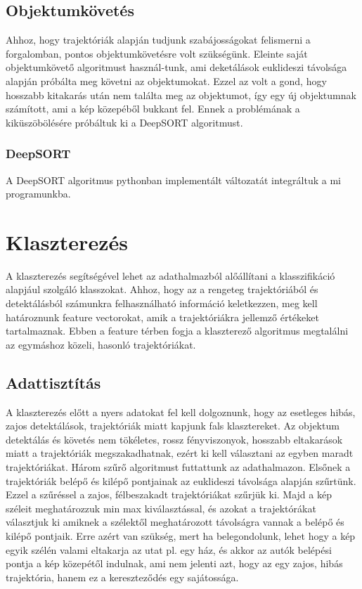 \documentclass[acmtog, authorversion]{acmart}
\begin{document}
\subsection{Objektumkövetés}
Ahhoz, hogy trajektóriák alapján tudjunk szabájosságokat felismerni a forgalomban, pontos objektumkövetésre volt szükségünk. Eleinte
saját objektumkövető algoritmust használ-tunk, ami deketálások euklideszi távolsága alapján próbálta meg követni az objektumokat.
Ezzel az volt a gond, hogy hosszabb kitakarás után nem találta meg az objektumot, így egy új objektumnak számított, ami a kép
közepéből bukkant fel. Ennek a problémának a kiküszöbölésére próbáltuk ki a DeepSORT algoritmust.
\subsubsection{DeepSORT}
A DeepSORT algoritmus pythonban implementált változatát integráltuk a mi programunkba.

\section{Klaszterezés}
A klaszterezés segítségével lehet az adathalmazból alőállítani a klasszifikáció alapjául szolgáló klasszokat. Ahhoz, hogy az
a rengeteg trajektóriából és detektálásból számunkra felhasználható információ keletkezzen, meg kell határoznunk feature
vectorokat, amik a trajektóriákra jellemző értékeket tartalmaznak. Ebben a feature térben fogja a klaszterező algoritmus
megtalálni az egymáshoz közeli, hasonló trajektóriákat.
\subsection{Adattisztítás}
A klaszterezés előtt a nyers adatokat fel kell dolgoznunk, hogy az esetleges hibás, zajos detektálások, trajektóriák miatt
kapjunk fals klasztereket. Az objektum detektálás és követés nem tökéletes, rossz fényviszonyok, hosszabb eltakarások miatt 
a trajektóriák megszakadhatnak, ezért ki kell választani az egyben maradt trajektóriákat. Három szűrő algoritmust futtattunk 
az adathalmazon. Elsőnek a trajektóriák belépő és kilépő pontjainak az euklideszi távolsága alapján szűrtünk. Ezzel a szűréssel a zajos, félbeszakadt trajektóriákat szűrjük ki.
Majd a kép széleit meghatározzuk min max kiválasztással, és azokat a trajektórákat választjuk ki amiknek a szélektől meghatározott
távolságra vannak a belépő és kilépő pontjaik. Erre azért van szükség, mert ha belegondolunk, lehet hogy a kép egyik szélén valami eltakarja az utat pl. egy ház, és akkor az autók belépési pontja a kép közepétől indulnak, ami nem jelenti azt, hogy az egy zajos, hibás trajektória, hanem ez a kereszteződés egy sajátossága. 
\end{document}
